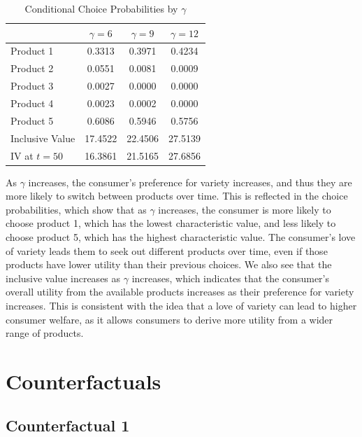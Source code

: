 \documentclass[12pt]{article}
\begin{document}
    \begin{table}[h]
    \centering
    \caption{Conditional Choice Probabilities by $\gamma$}
    \begin{tabular}{lccc}
    \hline\hline
    & $\gamma = 6$ & $\gamma = 9$ & $\gamma = 12$ \\
    \hline
    Product 1       & 0.3313  & 0.3971  & 0.4234  \\
    Product 2       & 0.0551  & 0.0081  & 0.0009  \\
    Product 3       & 0.0027  & 0.0000  & 0.0000  \\
    Product 4       & 0.0023  & 0.0002  & 0.0000  \\
    Product 5       & 0.6086  & 0.5946  & 0.5756  \\
    \hline
    Inclusive Value & 17.4522 & 22.4506 & 27.5139 \\
    IV at $t=50$    & 16.3861 & 21.5165 & 27.6856 \\
    \hline\hline
    \end{tabular}
    \end{table}

    As $\gamma$ increases, the consumer's preference for variety increases, and thus they are more likely to switch between products over time. This is reflected in the choice probabilities, which show that as $\gamma$ increases, the consumer is more likely to choose product 1, which has the lowest characteristic value, and less likely to choose product 5, which has the highest characteristic value. The consumer's love of variety leads them to seek out different products over time, even if those products have lower utility than their previous choices. We also see that the inclusive value increases as $\gamma$ increases, which indicates that the consumer's overall utility from the available products increases as their preference for variety increases. This is consistent with the idea that a love of variety can lead to higher consumer welfare, as it allows consumers to derive more utility from a wider range of products.


\section{Counterfactuals}

    \subsection{Counterfactual 1}
\end{document}
